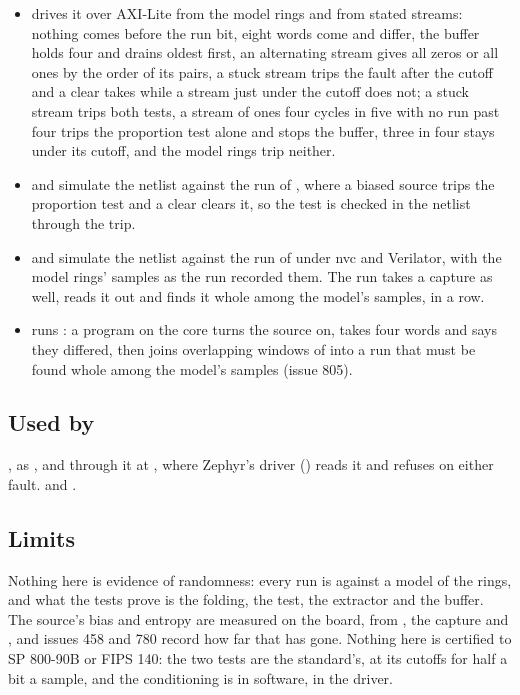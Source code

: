 \begin{itemize}
\item {} drives it over AXI-Lite from the
model rings and from stated streams: nothing comes before the run bit,
eight words come and differ, the buffer holds four and drains oldest
first, an alternating stream gives all zeros or all ones by the order
of its pairs, a stuck stream trips the fault after the cutoff and a
clear takes while a stream just under the cutoff does not; a stuck
stream trips both tests, a stream of ones four cycles in five with no run
past four trips the proportion test alone and stops the buffer, three
in four stays under its cutoff, and the model rings trip neither.
\item {} and
 simulate the netlist against the
run of , where a biased source trips the
proportion test and a clear clears it, so the test is checked in the
netlist through the trip.
\item {} and
 simulate the netlist against the run of
 under nvc and Verilator, with the model rings' samples
as the run recorded them. The run takes a capture as well, reads it
out and finds it whole among the model's samples, in a row.
\item {} runs
: a program on the
core turns the source on, takes four words and says they differed,
then joins overlapping windows of  into a run that must be
found whole among the model's samples (issue 805).
\end{itemize}

\subsection*{Used by}

, as , and through it  at
, where Zephyr's driver
() reads it and refuses
on either fault.  and .

\subsection*{Limits}

Nothing here is evidence of randomness: every run is against a model
of the rings, and what the tests prove is the folding, the test, the
extractor and the buffer. The source's bias and entropy are measured
on the board, from , the capture and , and
issues 458 and 780 record how far that has gone. Nothing here is
certified to SP 800-90B or FIPS 140: the two tests are the standard's,
at its cutoffs for half a bit a sample, and the conditioning is in
software, in the driver.
